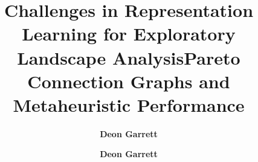 \documentclass[a4paper,10pt]{cvclean}
\begin{document}
\begin{publications}
  \begin{presentations}
    \begin{talk}
      \title{Challenges in Representation Learning for Exploratory Landscape
        Analysis}
      \author{\textbf{Deon Garrett}}
    \end{talk}
    \begin{talk}
      \title{Pareto Connection Graphs and Metaheuristic Performance}
      \author{\textbf{Deon Garrett}}
    \end{talk}  
  \end{presentations}
\end{publications}
\end{document}

